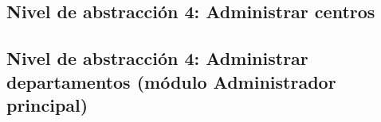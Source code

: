 \subsection{Nivel de abstracción 4: Administrar centros}



\subsection{Nivel de abstracción 4: Administrar departamentos (módulo Administrador principal)}

